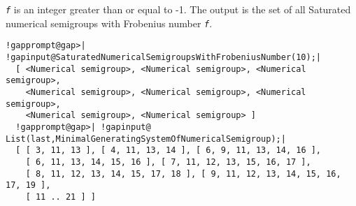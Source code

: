 \documentclass[a4paper,11pt]{report}
\begin{document}
{{{ \mbox{\texttt{\mdseries\slshape f}} is an integer greater than or equal to -1. The output is the set of all
Saturated numerical semigroups with Frobenius number \mbox{\texttt{\mdseries\slshape f}}. 
\begin{Verbatim}[commandchars=!@|,fontsize=\small,frame=single,label=Example]
  !gapprompt@gap>| !gapinput@SaturatedNumericalSemigroupsWithFrobeniusNumber(10);|
  [ <Numerical semigroup>, <Numerical semigroup>, <Numerical semigroup>, 
    <Numerical semigroup>, <Numerical semigroup>, <Numerical semigroup>, 
    <Numerical semigroup>, <Numerical semigroup> ]
  !gapprompt@gap>| !gapinput@ List(last,MinimalGeneratingSystemOfNumericalSemigroup);|
  [ [ 3, 11, 13 ], [ 4, 11, 13, 14 ], [ 6, 9, 11, 13, 14, 16 ], 
    [ 6, 11, 13, 14, 15, 16 ], [ 7, 11, 12, 13, 15, 16, 17 ], 
    [ 8, 11, 12, 13, 14, 15, 17, 18 ], [ 9, 11, 12, 13, 14, 15, 16, 17, 19 ], 
    [ 11 .. 21 ] ]
\end{Verbatim}
 }

 }

 }

 
\end{document}
